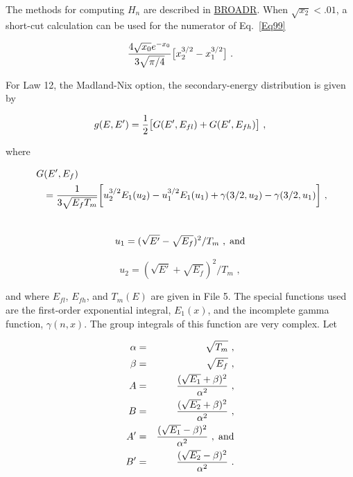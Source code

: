 \noindent
The methods for computing $H_n$ are described in
\hyperlink{sBROADRhy}{BROADR}.  When $\sqrt{x_2}<.01$, a
short-cut calculation can be used
for the numerator of Eq.~\ref{Eq99}

  \begin{equation}
    {{4\sqrt{x_0}e^{-x_0}}\over{3\sqrt{\pi /4}}}
    \bigl[ x_2^{3/2}-x_1^{3/2} \bigr]\,\,.
  \end{equation}
\vspace{0.5 pt}

For Law 12, the Madland-Nix option, the secondary-energy
distribution is given by

  \begin{equation}
    g(E,E')={1 \over 2} \bigl[ G(E',E_{fl})+G(E',E_{fh}) \bigr]\,\,,
  \end{equation}

\noindent
where

  \begin{eqnarray}
    \lefteqn{G(E',E_f)}\nonumber\\
    & & ={{1}\over {3\sqrt{E_fT_m}}}
    \biggl[ u_2^{3/2}E_1(u_2)-u_1^{3/2}E_1(u_1)
    +\gamma (3/2,u_2)-\gamma (3/2,u_1) \biggr]\,\,,\nonumber\\
    \mbox{ }
  \end{eqnarray}

  \begin{equation}
    u_1=(\sqrt{E'}-\sqrt{E_f})^2 / T_m\,\,,\;\hbox{and}
  \end{equation}

  \begin{equation}
    u_2=(\sqrt{E'}+\sqrt{E_f})^2 / T_m\,\,,
  \end{equation}

\noindent
and where $E_{fl}$, $E_{fh}$, and $T_m(E)$ are given in File 5.
The special functions used are the first-order exponential integral,
$E_1(x)$, and the incomplete gamma function, $\gamma (n,x)$.
The group integrals of this function are very complex\cite{ref14}.  Let

  \begin{eqnarray}
    \alpha &=& \sqrt{T_m}\,\,,\\
    \beta &=& \sqrt{E_f}\,\,,\\
    A&=& {{(\sqrt{E_1}+\beta )^2} \over {\alpha^2}}\,\,,\\
    B&=& {{(\sqrt{E_2}+\beta )^2} \over {\alpha^2}}\,\,,\\
    A'&=& {{(\sqrt{E_1}-\beta )^2} \over {\alpha^2}}\,\,,\;\hbox{and}\\
    B'&=& {{(\sqrt{E_2}-\beta )^2} \over {\alpha^2}}\,\,.
  \end{eqnarray}


